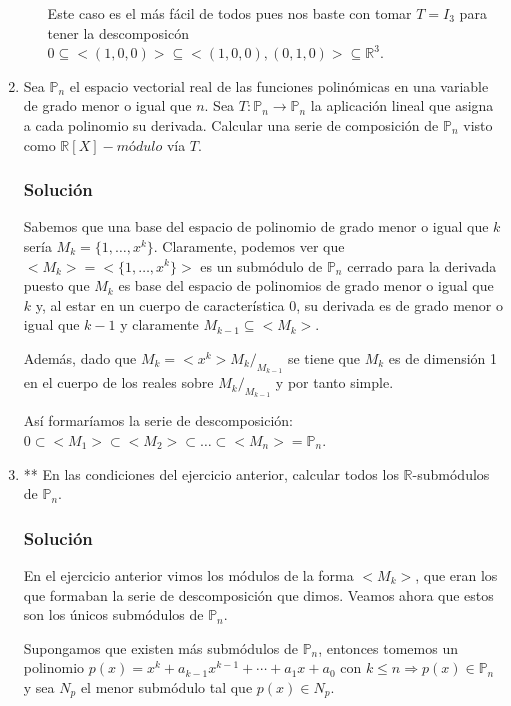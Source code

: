 \documentclass[paper=a4, fontsize=11pt, spanish]{scrartcl}
\begin{document}
\begin{enumerate}
\begin{itemize}
			Este caso es el más fácil de todos pues nos baste con tomar $T = I_3$ para tener la descomposicón
			$0 \subseteq <(1, 0, 0)> \subseteq <(1, 0, 0), (0, 1, 0)> \subseteq \mathbb{R}^3$.
		\end{itemize}
		
		\item Sea $\mathbb{P}_n$ el espacio vectorial real de las funciones polinómicas en una variable de grado
		menor o igual que $n$. Sea $T: \mathbb{P}_n \rightarrow \mathbb{P}_n$ la aplicación lineal que asigna a
		cada polinomio su derivada. Calcular una serie de composición de $\mathbb{P}_n$ visto como $\mathbb{R}[X]
		-módulo$ vía $T$.
		\subsubsection*{Solución}
		Sabemos que una base del espacio de polinomio de grado menor o igual que $k$ sería $M_k = \{1, \dots, x^k\}$.
		Claramente, podemos ver que $<M_k> = <\{1, \dots, x^k\}>$ es un submódulo de $\mathbb{P}_n$ cerrado para
		la derivada puesto que $M_k$ es base del espacio de polinomios de grado menor o igual que $k$ y, al estar
		en un cuerpo de característica 0, su derivada es de grado menor o igual que $k-1$ y claramente $M_{k-1}
		\subseteq <M_k>$.
		
		Además, dado que $M_k = <x^k> M_k/_{M_{k-1}}$ se tiene que $M_k$ es de dimensión 1 en el cuerpo de los
		reales sobre $M_k/_{M_{k-1}}$ y por tanto simple.
		
		Así formaríamos la serie de descomposición: $0 \subset <M_1> \subset <M_2> \subset \dots \subset <M_n> =
		\mathbb{P}_n$.
		
		\item ** En las condiciones del ejercicio anterior, calcular todos los $\mathbb{R}$-submódulos de
		$\mathbb{P}_n$.
		\subsubsection*{Solución}
		En el ejercicio anterior vimos los módulos de la forma $<M_k>$, que eran los que formaban la serie de
		descomposición que dimos. Veamos ahora que estos son los únicos submódulos de $\mathbb{P}_n$.
		
		Supongamos que existen más submódulos de $\mathbb{P}_n$, entonces tomemos un polinomio $p(x) = x^k +
		a_{k-1}x^{k-1} + \cdots + a_1x+a_0$ con $k \leq n \Rightarrow p(x) \in \mathbb{P}_n$ y sea $N_p$ el menor
		submódulo tal que $p(x) \in N_p$.
		

\end{enumerate}
\end{document}
